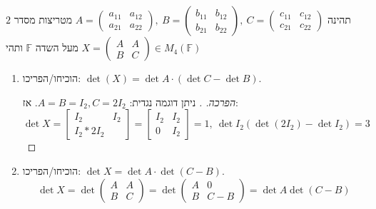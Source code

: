 \documentclass[]{article}
\newcommand\F         {\mathbb{F}}
\newcommand\pms[1]    {\begin{pmatrix}
		#1
\end{pmatrix}}
\begin{document}
	\section{}
	תהינה $A = \pms{a_{11} & a_{12} \\ a_{21}  &a_{22}}, \ B = \pms{b_{11} & b_{12} \\ b_{21} & b_{22}}, \ C = \pms{c_{11} & c_{12} \\ c_{21} & c_{22}}$ מטריצות מסדר $2$ מעל השדה $\F$ ותהי $X = \pms{A & A \\ B & C} \in M_4(\F)$
	\begin{enumerate}
		\item הוכיחו/הפריכו: $\det(X) = \det A \cdot (\det C - \det B)$. 
		\begin{proof}[הפרכה. ]
			ניתן דוגמה נגדית: $A = B = I_2, C = 2I_2$. אז: 
			\[ \det X = \begin{bmatrix}
				I_2 & I_2 \\ I_2 * 2I_2
			\end{bmatrix} = \begin{bmatrix}
				I_2 & I_2 \\ 0 & I_2
			\end{bmatrix} = 1, \ \det I_2 (\det (2I_2) - \det I_2) = 3 \]
		\end{proof}
		\item הוכיחו/הפריכו: $\det X = \det A \cdot \det (C - B)$. 
		\[ \det X = \det\pms{A & A \\ B & C} = \det \pms{A & 0 \\ B & C - B} = \det A \det (C - B) \]
	\end{enumerate}
	
\end{document}
